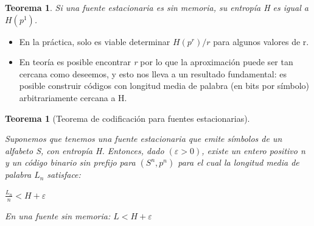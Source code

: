 \documentclass{beamer}
\theoremstyle{plain}
\newtheorem{teorema} [Teorema] {Teorema}
\theoremstyle{example}
\theoremstyle{example}
\begin{document}
\begin{frame}  \small 

\begin{teorema}
Si una fuente estacionaria es sin memoria, su entropía H es igual a $H(p^1)$.
\end{teorema}

\begin{itemize}
\item En la práctica, solo es viable determinar $H(p^r)/r$ para algunos valores de r. 

\item En teoría es posible encontrar \textit{r} por lo que la aproximación puede ser tan cercana como deseemos, y esto nos lleva a un resultado fundamental: es posible construir códigos con longitud media de palabra (en bits por símbolo) arbitrariamente cercana a H.

\end{itemize}


\begin{teorema} [Teorema de codificación para fuentes estacionarias] \label{theorem:coding}

Suponemos que tenemos una fuente estacionaria que emite símbolos de un alfabeto S, con entropía H. Entonces, dado $(\varepsilon >0)$, existe un entero positivo n y un código binario sin prefijo para $(S^n,p^n)$ para el cual la longitud media de palabra $L_n$ satisface:

 \begin{center}
$\frac{L_n} {n} < H+\varepsilon$
\end{center}

\tiny En una fuente sin memoria:  $ L < H+\varepsilon$

\end{teorema}
\end{frame} 
\end{document}
